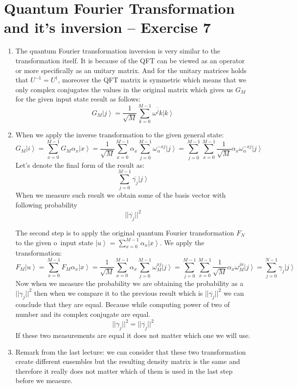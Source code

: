 \documentclass[a4paper,10pt]{article}
\newcommand{\ket}[1]{\ensuremath{\left|#1\right\rangle}} %
\begin{document}
\section*{Quantum Fourier Transformation and it's inversion -- Exercise 7}
\begin{enumerate}[1]
\item The quantum Fourier transformation inversion is very similar to the transformation itself. It is because of the QFT can be viewed as an operator or more specifically as an unitary matrix. And for the unitary matrices holds that $U^{-1}=U^{\dagger}$, moreover the QFT matrix is symmetric which means that we only complex conjugates the values in the original matrix which gives us $G_M$ for the given input state result as follows:
$$G_M \ket{j} = \frac{1}{\sqrt{M}} \sum_{k=0}^{M-1} \overline{\omega^jk} \ket{k} $$

\item 
When we apply the inverse transformation to the given general state:
$$
G_M\ket{i} = \sum_{x=0}^{M-1} G_M \alpha_x \ket{x} = \frac{1}{\sqrt{M}}\sum_{x=0}^{M-1} \alpha_x \sum_{j=0}^{M-1} \omega_\alpha^{-xj} \ket{j} = \sum_{j=0}^{M-1} \sum_{x=0}^{M-1} \frac{1}{\sqrt{M}} \alpha_x  \omega_\alpha^{-xj} \ket{j}
$$
Let's denote the final form of the result as:
$$
\sum_{j=0}^{M-1} \overline{\gamma_j} \ket{j}
$$
When we measure such result we obtain some of the basis vector with following probability
$$
|| \overline{\gamma_j} ||^2
$$

The second step is to apply the original quantum Fourier transformation $F_N$ to the given o~input state \ket{u} = $\sum_{x=0}^{M-1} \alpha_x\ket{x}$.
We apply the transformation:
$$
F_M\ket{u} = \sum_{x=0}^{M-1} F_M \alpha_x \ket{x} = \frac{1}{\sqrt{M}}  \sum_{x=0}^{M-1} \alpha_x \sum_{j=0}^{M-1} \omega_M^{xj} \ket{j} = \sum_{j=0}^{M-1} \sum_{x=0}^{M-1}  \frac{1}{\sqrt{M}} \alpha_x \omega_M^{jx} \ket{j} =  \sum_{j=0}^{N-1} \gamma_j\ket{j}
$$
Now when we measure the probability we are obtaining the probability as a $|| \gamma_j ||^2$ then when we compare it to the previous result which is $|| \overline{\gamma_j} ||^2$ we can conclude that they are equal. Because while computing power of two of number and its complex conjugate are equal.
$$
|| \gamma_j ||^2 = || \overline{\gamma_j} ||^2
$$
If these two measurements are equal it does not matter which one we will use.

\item Remark from the last lecture: we can consider that these two transformation create different ensembles but the resulting density matrix is the same and therefore it really does not matter which of them is used in the last step before we measure. 
\end{enumerate}
\end{document}
